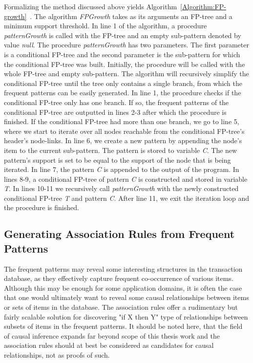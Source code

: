 Formalizing the method discussed above yields Algorithm~\ref{Algorithm:FP-growth}~\cite{Hipp:2000:AAR:360402.360421}. The algorithm \textit{FPGrowth} takes as its arguments an FP-tree and a minimum support threshold. In line 1 of the algorithm, a procedure \textit{patternGrowth} is called with the FP-tree and an empty sub-pattern denoted by value \textit{null}. The procedure \textit{patternGrowth} has two parameters. The first parameter is a conditional FP-tree and the second parameter is the sub-pattern for which the conditional FP-tree was built. Initially, the procedure will be called with the whole FP-tree and empty sub-pattern. The algorithm will recursively simplify the conditional FP-tree until the tree only contains a single branch, from which the frequent patterns can be easily generated. In line 1, the procedure checks if the conditional FP-tree only has one branch. If so, the frequent patterns of the conditional FP-tree are outputted in lines 2-3 after which the procedure is finished. If the conditional FP-tree had more than one branch, we go to line 5, where we start to iterate over all nodes reachable from the conditional FP-tree's header's node-links. In line 6, we create a new pattern by appending the node's item to the current sub-pattern. The pattern is stored to variable \textit{C}. The new pattern's support is set to be equal to the support of the node that is being iterated. In line 7, the pattern \textit{C} is appended to the output of the program. In lines 8-9, a conditional FP-tree of pattern \textit{C} is constructed and stored in variable \textit{T}. In lines 10-11 we recursively call \textit{patternGrowth} with the newly constructed conditional FP-tree \textit{T} and pattern \textit{C}. After line 11, we exit the iteration loop and the procedure is finished.           

\subsection{Generating Association Rules from Frequent Patterns}

The frequent patterns may reveal some interesting structures in the transaction database, as they effectively capture frequent co-occurrence of various items. Although this may be enough for some application domains, it is often the case that one would ultimately want to reveal some causal relationships between items or sets of items in the database. The association rules offer a rudimentary but fairly scalable solution for discovering "if X then Y" type of relationships between subsets of items in the frequent patterns. It should be noted here, that the field of causal inference expands far beyond scope of this thesis work and the association rules should at best be considered as candidates for causal relationships, not as proofs of such.

